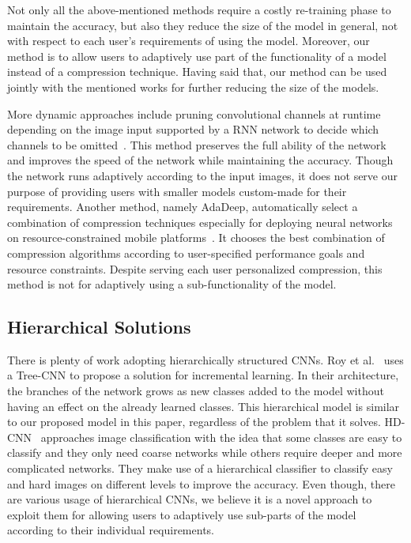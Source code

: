 Not only all the above-mentioned methods require a costly re-training phase to maintain the accuracy,
but also they reduce the size of the model in general, not with respect to each user's requirements of using the model. 
Moreover, our method is to allow users to adaptively use part of the functionality of a model instead of a compression technique.
Having said that, our method can be used jointly with the mentioned works for further reducing the size of the models.

More dynamic approaches include pruning convolutional channels at runtime depending on the image input supported by a RNN network to decide which channels to be omitted~\cite{Lin2017RuntimeNP}. 
This method preserves the full ability of the network and improves the speed of the network while maintaining the accuracy. 
Though the network runs adaptively according to the input images, it does not serve our purpose of providing users with smaller models custom-made for their requirements. 
Another method, namely AdaDeep, automatically select a combination of compression techniques especially for deploying neural networks on resource-constrained mobile platforms~\cite{Liu2018OnDemandDM}. 
It chooses the best combination of compression algorithms according to user-specified performance goals and resource constraints. 
Despite serving each user personalized compression, this method is not for adaptively using a sub-functionality of the model.

\subsection*{Hierarchical Solutions}

There is plenty of work adopting hierarchically structured CNNs. Roy et al.~\cite{roy2018tree} uses a Tree-CNN to propose a solution for incremental learning. 
In their architecture, the branches of the network grows as new classes added to the model without having an effect on the already learned classes. 
This hierarchical model is similar to our proposed model in this paper, regardless of the problem that it solves. 
HD-CNN~\cite{Yan_2015_ICCV} approaches image classification with the idea that some classes are easy to classify and they only need coarse networks while others require deeper and more complicated networks. 
They make use of a hierarchical classifier to classify easy and hard images on different levels to improve the accuracy. 
Even though, there are various usage of hierarchical CNNs, we believe it is a novel approach to exploit them for allowing users to adaptively use sub-parts of the model according to their individual requirements.

